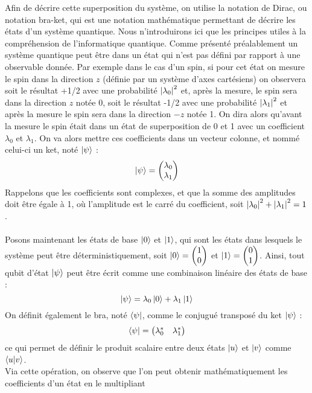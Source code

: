 Afin de décrire cette superposition du système, on utilise la notation de Dirac, ou notation bra-ket, qui est une
notation mathématique permettant de décrire les états d'un système quantique.
Nous n'introduirons ici que les principes utiles à la compréhension de l'informatique quantique.
Comme présenté préalablement un système quantique peut être dans un état qui n’est pas défini par rapport
à une observable donnée.
Par exemple dans le cas d’un spin, si pour cet état on mesure le spin dans la direction $z$ (définie par un
système d’axes cartésiens) on observera soit le résultat +1/2 avec une probabilité $\abs{\lambda_0}^2$ et, après la mesure,
le spin sera dans la direction $z$ notée 0, soit le résultat -1/2 avec une probabilité $\abs{\lambda_1}^2$ et après la mesure le
spin sera dans la direction $-z$ notée 1.
On dira alors qu’avant la mesure le spin était dans un état de superposition de 0 et 1 avec un coefficient
$\lambda_0$ et $\lambda_1$.
On va alors mettre ces coefficients dans un vecteur colonne, et nommé celui-ci un ket, noté $\ket{\psi}$ :
\[
    \ket{\psi} = \begin{pmatrix} \lambda_0 \\ \lambda_1 \end{pmatrix}
\]
Rappelons que les coefficients sont complexes, et que la somme des amplitudes doit être égale à 1, où l'amplitude est
le carré du coefficient, soit $\abs{\lambda_0}^2 + \abs{\lambda_1}^2 = 1$.\\ \\
Posons maintenant les états de base $\ket{0}$ et $\ket{1}$, qui sont les états dans lesquels le système peut être
déterministiquement, soit $\ket{0} = \begin{pmatrix} 1 \\ 0 \end{pmatrix}$ et $\ket{1} = \begin{pmatrix} 0 \\ 1
\end{pmatrix}$.
Ainsi, tout qubit d'état $\ket{\psi}$ peut être écrit comme une combinaison linéaire des états de base :
\[
    \ket{\psi} = \lambda_0 \ket{0} + \lambda_1 \ket{1}
\]
On définit également le bra, noté $\bra{\psi}$, comme le conjugué transposé du ket $\ket{\psi}$ :
\[
    \bra{\psi} = \begin{pmatrix} \lambda_0^* & \lambda_1^* \end{pmatrix}
\]
ce qui permet de définir le produit scalaire entre deux états $\ket{u}$ et $\ket{v}$ comme $\bra{u}\ket{v}$.\\
Via cette opération, on observe que l'on peut obtenir mathématiquement les coefficients d'un état en le multipliant
